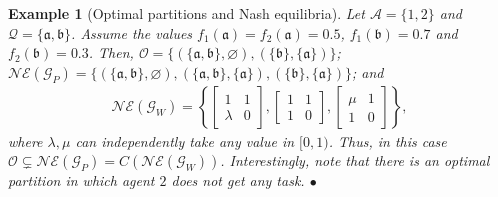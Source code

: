 \documentclass{IEEEtran}
\newcommand{\Mcal}[1]{\mathcal{#1}}
\newcommand{\Mc}[1]{\mathcal{#1}}
\newcommand{\thmtitle}[1]{\mbox{}\emph{(#1).}}
\newtheorem{example}[theorem]{Example}
\newcommand{\bulletsym}{\hbox{$\bullet$}}
\newcommand{\bulletend}{\relax\ifmmode\else\unskip\hfill\fi\bulletsym}
\def \agt{\Mcal{A}}
\def \game{\mathscr{G}}
\def \ne{\Mc{NE}}
\def \opt{\Mc{O}}
\def \setfunc{C}
\def \tsk{\Mc{Q}}
\newcommand{\tskind}[1]{\mathfrak{#1}}
\begin{document}
\begin{example}[Optimal partitions and Nash equilibria]\label{ex:superset_structure}
Let $\agt = \{1,2\}$ and $\tsk = \{\tskind{a},\tskind{b}\}$. Assume the values $f_1(\tskind{a}) = f_2(\tskind{a}) = 0.5$, $f_1(\tskind{b}) = 0.7$ and $f_2(\tskind{b}) = 0.3$. Then, $\opt = \{(\{\tskind{a},\tskind{b}\},\varnothing),(\{\tskind{b}\},\{\tskind{a}\})\}$; $\ne(\game_P) = \{(\{\tskind{a},\tskind{b}\},\varnothing),(\{\tskind{a},\tskind{b}\},\{\tskind{a}\}),(\{\tskind{b}\},\{\tskind{a}\})\}$; and  
\begin{align*}
	\ne(\game_W) = \left\{
	\begin{bmatrix}
		1 & 1\\
		\lambda & 0 
	\end{bmatrix},
	\begin{bmatrix}
		1 & 1\\
		1 & 0
	\end{bmatrix},
	\begin{bmatrix}
		\mu & 1\\
		1 & 0
	\end{bmatrix} \right\},
\end{align*}
where $\lambda,\mu$ can independently take any value in $[0,1)$. Thus, in this case $\opt \subsetneq \ne(\game_P) = \setfunc(\ne(\game_W))$. Interestingly, note that there is an optimal partition in which agent $2$ does not get any task. %
\bulletend
\end{example}
\end{document}
